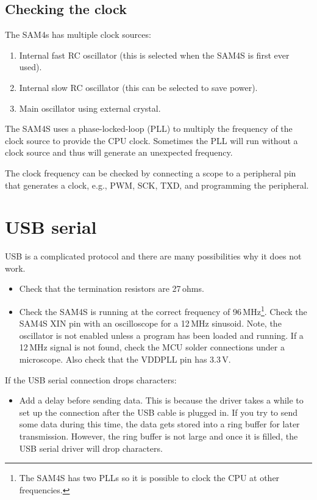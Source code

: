 \subsection{Checking the clock}
\label{checking-the-clock}

The SAM4s has multiple clock sources:

\begin{enumerate}
\item
  Internal fast RC oscillator (this is selected when the SAM4S is first
  ever used).
\item
  Internal slow RC oscillator (this can be selected to save power).
\item
  Main oscillator using external crystal.
\end{enumerate}

The SAM4S uses a phase-locked-loop (PLL) to multiply the frequency of
the clock source to provide the CPU clock. Sometimes the PLL will run
without a clock source and thus will generate an unexpected frequency.

The clock frequency can be checked by connecting a scope to a
peripheral pin that generates a clock, e.g., PWM, SCK, TXD, and
programming the peripheral.


\section{USB serial}
\label{debugging-usb}

USB is a complicated protocol and there are many possibilities why it
does not work.

  \begin{itemize}
  \item
    Check that the termination resistors are 27\,ohms.
    
  \item Check the SAM4S is running at the correct frequency of
    96\,MHz\footnote{The SAM4S has two PLLs so it is possible to clock
      the CPU at other frequencies.}.  Check the SAM4S XIN pin with an
    oscilloscope for a 12\,MHz sinusoid.  Note, the oscillator is not
    enabled unless a program has been loaded and running. If a 12\,MHz
    signal is not found, check the MCU solder connections under a
    microscope. Also check that the VDDPLL pin has 3.3\,V.
  \end{itemize}

  If the USB serial connection drops characters:
 \begin{itemize}
 \item Add a delay before sending data.  This is because the driver
   takes a while to set up the connection after the USB cable is
   plugged in.  If you try to send some data during this time, the
   data gets stored into a ring buffer for later transmission.
   However, the ring buffer is not large and once it is filled, the
   USB serial driver will drop characters.
 \end{itemize}

